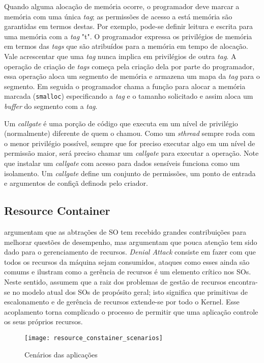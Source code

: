 Quando alguma alocação de memória ocorre, o programador deve marcar a memória
com uma única \emph{tag}; as permissões de acesso a está memória são garantidas
em termos destas. Por exemplo, pode-se definir leitura e escrita para uma
memória com a \emph{tag} "t". O programador expressa os privilégios de memória
em termos das \emph{tags} que são atribuídos para a memória em tempo de
alocação. Vale acrescentar que uma \emph{tag} nunca implica em privilégios de
outra \emph{tag}. A operação de criação de \emph{tags} começa pela criação dela
por parte do programador, essa operação aloca um segmento de memória e armazena
um mapa da \emph{tag} para o segmento. Em seguida o programador chama a função
para alocar a memória marcada (\texttt{smalloc}) especificando a \emph{tag} e o
tamanho solicitado e assim aloca um \emph{buffer} do segmento com a \emph{tag}.

Um \emph{callgate} é uma porção de código que executa em um nível de privilégio
(normalmente) diferente de quem o chamou. Como um \emph{sthread} sempre roda
com o menor privilégio possível, sempre que for preciso executar algo em um
nível de permissão maior, será preciso chamar um \emph{callgate} para executar
a operação. Note que instalar um \emph{callgate} com acesso para dados
sensíveis funciona como um isolamento. Um \emph{callgate} define um conjunto de
permissões, um ponto de entrada e argumentos de confiçã definods pelo criador.

\subsection{Resource Container}

\cite{resourcecontainers} argumentam que as abtrações de SO tem recebido grandes
contribuições para melhorar questões de desempenho, mas argumentam que pouca
atenção tem sido dado para o gerenciamento de recursos. \emph{Denial Attack}
consiste em fazer com que todos os recursos da máquina sejam consumidos,
ataques como esses ainda são comums e ilustram como a gerência de recursos é
um elemento crítico nos SOs. Neste sentido, \cite{resourcecontainers}
assumem que a raiz dos problemas de gestão de recursos encontra-se no modelo
atual dos SOs de propósito geral; isto significa que primitivas de
escalonamento e de gerência de recursos extende-se por todo o Kernel. Esse
acoplamento torna complicado o processo de permitir que uma aplicação controle
os seus próprios recursos.

\begin{figure}[!h]
  \centering
  \texttt{[image: resource\_constainer\_scenarios]} 
  \caption{Cenários das aplicações}
  \label{fig:resource_constainer_scenarios}
\end{figure}

